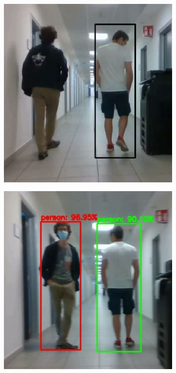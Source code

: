 \begin{figure}[!h]
\begin{subfigure}[!h]{0.325\textwidth}
	\end{subfigure}
	\begin{subfigure}[!h]{0.325\textwidth}
		\includegraphics[width=\linewidth]{images/solution/sequenceTrackOk3}
	\end{subfigure}
	\begin{subfigure}[!h]{0.325\textwidth}
		\includegraphics[width=\linewidth]{images/solution/sequenceTrackOk6}

\end{subfigure}
\end{figure}
